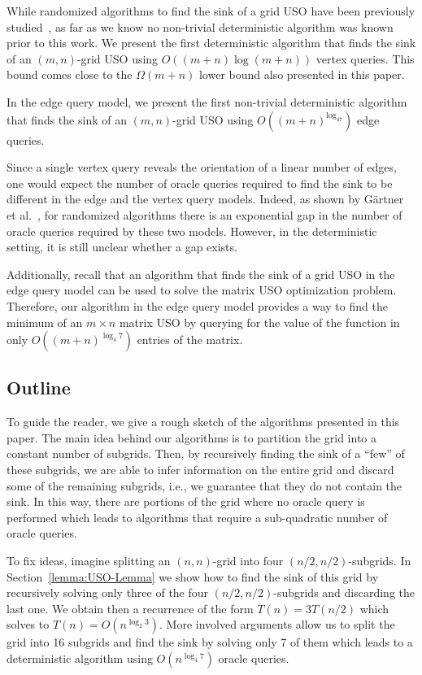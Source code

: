\documentclass[runningheads,a4paper]{llncs}
\begin{document}
While randomized algorithms to find the sink of a grid USO have been previously studied~\cite{grid05,grid08,linepoint,falkthesis}, as far as we know no non-trivial deterministic algorithm was known prior to this work. 
We present the first deterministic algorithm that finds the sink of an $(m,n)$-grid USO using $O((m+n)\log (m+n))$ vertex queries.
This bound comes close to the $\Omega(m+n)$ lower bound also presented in this paper.

In the edge query model, 
we present the first non-trivial deterministic algorithm that finds the sink of an $(m, n)$-grid USO using $O((m+n)^{\log_47})$ edge queries. 

Since a single vertex query reveals the orientation of a linear number of edges, one would expect the number of  oracle queries required to find the sink to be different in the edge and the vertex query models.
Indeed, as shown by G\"artner et al.~\cite{grid08}, for randomized algorithms there is an exponential gap in the number of oracle queries required by these two models.
However, in the deterministic setting, it is still unclear whether a gap exists.

Additionally, recall that an algorithm that finds the sink of a grid USO in the edge query model can be used to solve the matrix USO optimization problem. 
Therefore, our algorithm in the edge query model provides a way to find the minimum of an $m\times n$ matrix USO by querying for the value of the function in  only $O((m+n)^{\log_4 7})$ entries of the matrix. 

\subsection{Outline}

To guide the reader, we give a rough sketch of the algorithms presented in this paper.
The main idea behind our algorithms is to partition the grid into a constant number of subgrids. 
Then, by recursively finding the sink of a ``few'' of these subgrids, we are able to infer information on the entire grid and discard some of the remaining subgrids, i.e., we guarantee that they do not contain the sink. 
In this way, there are portions of the grid where no oracle query is performed which leads to algorithms that require a sub-quadratic number of oracle queries.

To fix ideas, imagine splitting an $(n,n)$-grid into four $(n/2, n/2)$-subgrids. 
In Section~\ref{lemma:USO-Lemma} we show how to find the sink of this grid by recursively solving only three of the four $(n/2, n/2)$-subgrids and discarding the last one. 
We obtain then a recurrence of the form $T(n) = 3 T(n/2)$ which solves to $T(n) = O(n^{\log_2 3})$.
More involved arguments allow us to split the grid into 16 subgrids and find the sink by solving only 7 of them which leads to a deterministic algorithm using $O(n^{\log_4 7})$ oracle queries. 
\end{document}
